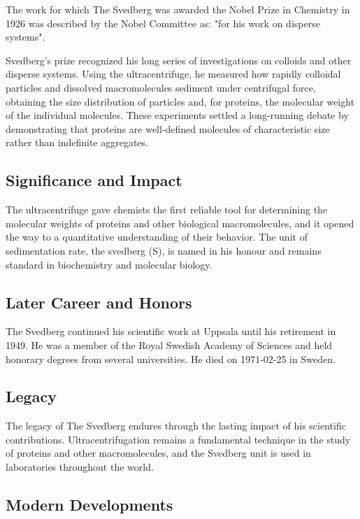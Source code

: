 The work for which The Svedberg was awarded the Nobel Prize in Chemistry in 1926 was described by the Nobel Committee as: "for his work on disperse systems".

Svedberg's prize recognized his long series of investigations on colloids and other disperse systems.
Using the ultracentrifuge, he measured how rapidly colloidal particles and dissolved macromolecules sediment under centrifugal force, obtaining the size distribution of particles and, for proteins, the molecular weight of the individual molecules.
These experiments settled a long-running debate by demonstrating that proteins are well-defined molecules of characteristic size rather than indefinite aggregates.

\subsection*{Significance and Impact}

The ultracentrifuge gave chemists the first reliable tool for determining the molecular weights of proteins and other biological macromolecules, and it opened the way to a quantitative understanding of their behavior.
The unit of sedimentation rate, the svedberg (S), is named in his honour and remains standard in biochemistry and molecular biology.

\subsection*{Later Career and Honors}

The Svedberg continued his scientific work at Uppsala until his retirement in 1949.
He was a member of the Royal Swedish Academy of Sciences and held honorary degrees from several universities.
He died on 1971-02-25 in Sweden.

\subsection*{Legacy}

The legacy of The Svedberg endures through the lasting impact of his scientific contributions.
Ultracentrifugation remains a fundamental technique in the study of proteins and other macromolecules, and the Svedberg unit is used in laboratories throughout the world.

\subsection*{Modern Developments}

